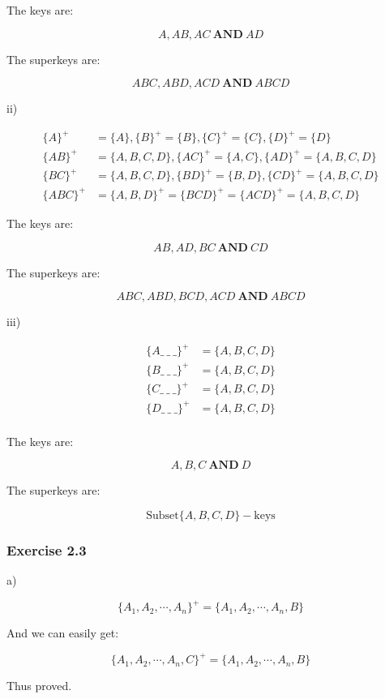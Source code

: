 \documentclass[../../main.tex]{subfiles}
\begin{document}
The keys are:

$$
A, AB, AC \ \mathbf{AND} \ AD
$$

The superkeys are:

$$
ABC, ABD, ACD \ \mathbf{AND} \ ABCD
$$

ii)

\begin{align*}
  \{A\}^{+} &= \{A\},   \{B\}^{+} = \{B\},
  \{C\}^{+} = \{C\}, \{D\}^{+}= \{D\} \\
  \{AB\}^{+} &= \{A,B,C,D\},  \{AC\}^{+} = \{A,C\},
  \{AD\}^{+} = \{A,B,C,D\} \\
  \{BC\}^{+} &= \{A,B,C,D\}, \{BD\}^{+} = \{B,D\},
  \{CD\}^{+} = \{A,B,C,D\} \\
  \{ABC\}^{+} &= \{A,B,D\}^{+} = \{BCD\}^{+} = \{ACD\}^{+} = \{A,B,C,D\}
\end{align*}

The keys are:

$$
AB, AD, BC \ \mathbf{AND} \ CD
$$

The superkeys are:

$$
ABC, ABD, BCD, ACD \ \mathbf{AND} \ ABCD
$$


iii)

\begin{align*}
  \{A \_ \ \_ \ \_ \}^{+} &= \{A,B,C,D\} \\
  \{B\_ \ \_ \ \_ \}^{+} &= \{A,B,C,D\} \\
  \{C\_ \ \_ \ \_ \}^{+} &= \{A,B,C,D\} \\
  \{D\_ \ \_ \ \_ \}^{+} &= \{A,B,C,D\} \\
\end{align*}

The keys are:

$$
A, B, C \ \mathbf{AND} \ D
$$

The superkeys are:

$$
\mbox{Subset} \{A,B,C,D\} - \mbox{keys}
$$

\subsubsection*{Exercise 2.3}

a)

$$
\{A_{1}, A_{2}, \cdots, A_{n}\} ^ {+} = \{A_{1}, A_{2}, \cdots, A_{n}, B\}
$$

And we can easily get:

$$
\{A_{1}, A_{2}, \cdots, A_{n}, C\} ^ {+} = \{A_{1}, A_{2}, \cdots, A_{n}, B\}
$$

Thus proved.
\end{document}

